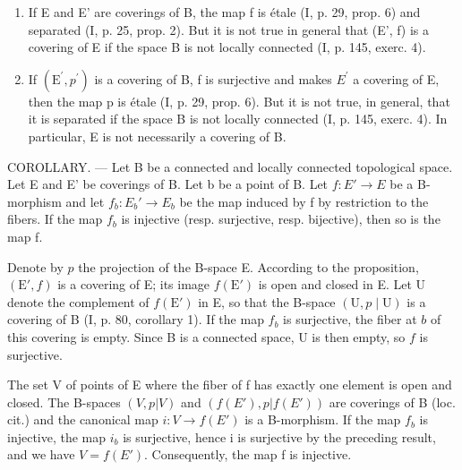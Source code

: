 \begin{enumerate}
\def\labelenumi{\alph{enumi})}
\item
  If E and E' are coverings of B, the map f is étale (I, p. 29, prop. 6) and separated (I, p. 25, prop. 2). But it is not true in general that (E', f) is a covering of E if the space B is not locally connected (I, p. 145, exerc. 4).
\item
  If \((\mathrm{E}^{\prime}, p^{\prime})\) is a covering of B, f is surjective and makes \(E^{\prime}\) a covering of E, then the map p is étale (I, p. 29, prop. 6). But it is not true, in general, that it is separated if the space B is not locally connected (I, p. 145, exerc. 4). In particular, E is not necessarily a covering of B.
\end{enumerate}

COROLLARY. --- Let B be a connected and locally connected topological space. Let E and E' be coverings of B. Let b be a point of B. Let \(f: E' \to E\) be a B-morphism and let \(f_{b}: E_{b}' \to E_{b}\) be the map induced by f by restriction to the fibers. If the map \(f_{b}\) is injective (resp. surjective, resp. bijective), then so is the map f.

Denote by \(p\) the projection of the B-space E. According to the proposition, \((\mathrm{E}', f)\) is a covering of E; its image \(f(\mathrm{E}')\) is open and closed in E. Let U denote the complement of \(f(\mathrm{E}')\) in E, so that the B-space \((\mathrm{U}, p \mid \mathrm{U})\) is a covering of B (I, p. 80, corollary 1). If the map \(f_b\) is surjective, the fiber at \(b\) of this covering is empty. Since B is a connected space, U is then empty, so \(f\) is surjective.

The set V of points of E where the fiber of f has exactly one element is open and closed. The B-spaces \((V, p|V)\) and \((f(E'), p|f(E'))\) are coverings of B (loc. cit.) and the canonical map \(i: V \to f(E')\) is a B-morphism. If the map \(f_b\) is injective, the map \(i_b\) is surjective, hence i is surjective by the preceding result, and we have \(V = f(E')\). Consequently, the map f is injective.

